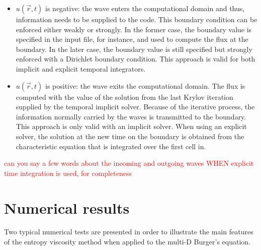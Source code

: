\begin{itemize}
\item $u(\vec{r},t) $ is negative: the wave enters the computational domain and thus, information needs to be supplied to the code. This boundary condition can be enforced either weakly or strongly. In the former case, the boundary value is specified in the input file, for instance, and used to compute the flux at the boundary. In the later case, the boundary value is still specified but strongly enforced with a Dirichlet boundary condition. This approach is valid for both implicit and explicit temporal integrators.
\item $u(\vec{r},t) $ is positive: the wave exits the computational domain. The flux is computed with the value of the solution from the last Krylov iteration supplied by the temporal implicit solver. Because of the iterative process, the information normally carried by the waves is transmitted to the boundary. This approach is only valid with an implicit solver. When using an explicit solver, the solution at the new time on the boundary is obtained from the characteristic equation that is integrated over the first cell in.
\end{itemize}
\textcolor{red}{can you say a few words about the incoming and outgoing waves WHEN explicit time integration is used, for completeness} 

\section{Numerical results}\label{sec:num_sct2b}
Two typical numerical tests are presented in order to illustrate the main features of the entropy viscosity method when applied to the multi-D Burger's equation.
